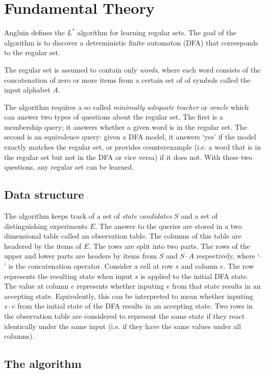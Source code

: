 \documentclass[multi,crop=false,class=article]{standalone}
\newcommand{\concat}{\cdot}
\begin{document}
\section{Fundamental Theory}
\label{sec:fundamental-theory}

Angluin defines the $L^*$ algorithm for learning regular sets\cite{Angluin87}.
The goal of the algorithm is to discover a deterministic finite automaton (DFA)
that corresponds to the regular set.

The regular set is assumed to contain only \textit{words}, where each word
consists of the concatenation of zero or more items from a certain set of of
symbols called the input alphabet $A$.

The algorithm requires a so called \textit{minimally adequate teacher} or
\textit{oracle} which can answer two types of questions about the regular set.
The first is a membership query; it answers whether a given word is in the
regular set. The second is an equivalence query: given a DFA model, it answers
`yes' if the model exactly matches the regular set, or provides counterexample
(i.e. a word that is in the regular set but not in the DFA or vice versa) if it
does not. With these two questions, any regular set can be learned.

\subsection {Data structure}

The algorithm keeps track of a set of \textit{state candidates} $S$ and a set of
distinguishing experiments  $E$. The answer to the queries are stored in a two
dimensional table called an observation table. The columns of this table are
headered by the items of $E$. The rows are split into two parts. The rows of the
upper and lower parts are headers by items from $S$ and $S \concat A$
respectively, where `$\concat$' is the concatenation operator. Consider a cell
at row $s$ and column $e$. The row represents the resulting state when input $s$
is applied to the initial DFA state. The value at column $e$ represents whether
inputing $e$ from that state results in an accepting state. Equivalently, this
can be interpreted to mean whether inputing $s \concat e$ from the initial state
of the DFA results in an accepting state. Two rows in the observation table are
considered to represent the same state if they react identically under the same
input (i.e. if they have the same values under all columns).

\subsection {The algorithm}
\end{document}
